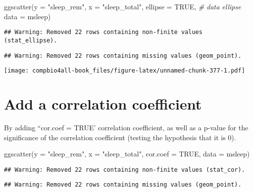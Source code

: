 \documentclass[
]{book}
\newenvironment{Shaded}{\begin{snugshade}}{\end{snugshade}}
\newcommand{\AttributeTok}[1]{\textcolor[rgb]{0.77,0.63,0.00}{#1}}
\newcommand{\CommentTok}[1]{\textcolor[rgb]{0.56,0.35,0.01}{\textit{#1}}}
\newcommand{\ConstantTok}[1]{\textcolor[rgb]{0.00,0.00,0.00}{#1}}
\newcommand{\FunctionTok}[1]{\textcolor[rgb]{0.00,0.00,0.00}{#1}}
\newcommand{\NormalTok}[1]{#1}
\newcommand{\StringTok}[1]{\textcolor[rgb]{0.31,0.60,0.02}{#1}}
\begin{document}
\begin{Shaded}
\begin{Highlighting}[]
\FunctionTok{ggscatter}\NormalTok{(}\AttributeTok{y =} \StringTok{"sleep\_rem"}\NormalTok{,}
          \AttributeTok{x =} \StringTok{"sleep\_total"}\NormalTok{,}
          \AttributeTok{ellipse =} \ConstantTok{TRUE}\NormalTok{,   }\CommentTok{\# data ellipse}
          \AttributeTok{data =}\NormalTok{ msleep)}
\end{Highlighting}
\end{Shaded}

\begin{verbatim}
## Warning: Removed 22 rows containing non-finite values (stat_ellipse).
\end{verbatim}

\begin{verbatim}
## Warning: Removed 22 rows containing missing values (geom_point).
\end{verbatim}

\texttt{[image: compbio4all-book\_files/figure-latex/unnamed-chunk-377-1.pdf]}

\hypertarget{add-a-correlation-coefficient-2}{%
\section{Add a correlation coefficient}\label{add-a-correlation-coefficient-2}}

By adding ``cor.coef = TRUE' correlation coefficient, as well as a p-value for the significance of the correlation coefficient (testing the hypothesis that it is 0).

\begin{Shaded}
\begin{Highlighting}[]
\FunctionTok{ggscatter}\NormalTok{(}\AttributeTok{y =} \StringTok{"sleep\_rem"}\NormalTok{,}
          \AttributeTok{x =} \StringTok{"sleep\_total"}\NormalTok{,}
          \AttributeTok{cor.coef =} \ConstantTok{TRUE}\NormalTok{,}
          \AttributeTok{data =}\NormalTok{ msleep)}
\end{Highlighting}
\end{Shaded}

\begin{verbatim}
## Warning: Removed 22 rows containing non-finite values (stat_cor).
\end{verbatim}

\begin{verbatim}
## Warning: Removed 22 rows containing missing values (geom_point).
\end{verbatim}
\end{document}
